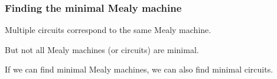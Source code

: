 \begin{frame}
    \frametitle{Finding the minimal Mealy machine}

    Multiple circuits correspond to the same Mealy machine.

    \pause

    But not all Mealy machines (or circuits) are \alert{minimal}.

    \pause

    If we can find minimal Mealy machines, we can also find minimal circuits.

\end{frame}